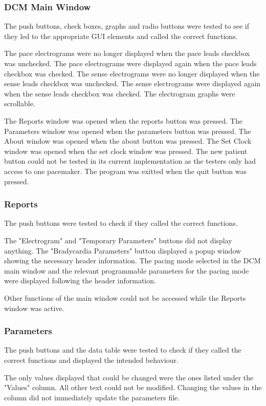 \documentclass[12pt]{article}
\begin{document}
\subsubsection{DCM Main Window}
The push buttons, check boxes, graphs and radio buttons were tested to see if they led to the appropriate GUI elements and called the correct functions.

The pace electrograms were no longer displayed when the pace leads checkbox was unchecked. The pace electrograms were displayed again when the pace leads checkbox was checked. The sense electrograms were no longer displayed when the sense leads checkbox was unchecked. The sense electrograms were displayed again when the sense leads checkbox was checked. The electrogram graphs were scrollable.

The Reports window was opened when the reports button was pressed. The Parameters window was opened when the parameters button was pressed. The About window was opened when the about button was pressed. The Set Clock window was opened when the set clock window was pressed. The new patient button could not be tested in its current implementation as the testers only had access to one pacemaker. The program was exitted when the quit button was pressed.

\subsubsection{Reports}
The push buttons were tested to check if they called the correct functions.

The "Electrogram" and "Temporary Parameters" buttons did not display anything. The "Bradycardia Parameters" button displayed a popup window showing the necessary header information. The pacing mode selected in the DCM main window and the relevant programmable parameters for the pacing mode were displayed following the header information. 

Other functions of the main window could not be accessed while the Reports window was active.

\subsubsection{Parameters}
The push buttons and the data table were tested to check if they called the correct functions and displayed the intended behaviour.

The only values displayed that could be changed were the ones listed under the "Values" column. All other text could not be modified. Changing the values in the column did not immediately update the parameters file. 
\end{document}
